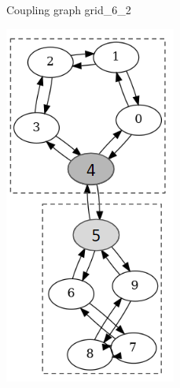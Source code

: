 \begin{figure}[!htb]
\begin{subfigure}{0.25\linewidth}
        \caption{Coupling graph grid\_6\_2}
        \label{fig:coupling-graph-grid}
    \end{subfigure}
    \hfill
    \begin{subfigure}{0.2\linewidth}
        \includegraphics[width=\linewidth]{image/coupling_graph_ring.png}

\end{subfigure}
\end{figure}
